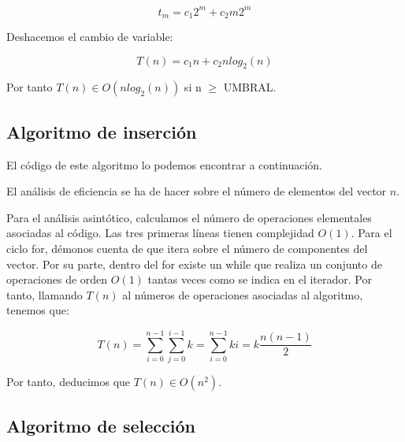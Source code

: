 \documentclass{homework}
\begin{document}
    \begin{equation}
        t_{m} = c_{1}2^{m} + c_{2}m2^{m}
    \end{equation}

    Deshacemos el cambio de variable:

    \begin{equation}
        T(n) = c_{1}n + c_{2}nlog_{2}(n)
    \end{equation}

    Por tanto $T(n) \in O(nlog_{2}(n))$ si n $\geq$ UMBRAL.

    \subsection{Algoritmo de inserción}

    El código de este algoritmo lo podemos encontrar a continuación.

    
    
    El análisis de eficiencia se ha de hacer sobre el número de elementos del vector $n$. 

    Para el análisis asintótico, calculamos el número de operaciones elementales asociadas al código. 
    Las tres primeras líneas tienen complejidad $O(1)$. Para el ciclo for, démonos cuenta de que itera sobre el número de
    componentes del vector. Por su parte, dentro del for existe un while que realiza un conjunto de operaciones de orden
    $O(1)$ tantas veces como se indica en el iterador. Por tanto, llamando $T(n)$ al números de operaciones asociadas
    al algoritmo, tenemos que:

    \begin{equation*}
        T(n) = \sum_{i=0}^{n-1} \sum_{j=0}^{i-1} k = \sum_{i=0}^{n-1} ki = k \frac{n(n-1)}{2} 
    \end{equation*}

    Por tanto, deducimos que $T(n) \in O(n^2)$. 

    \subsection{Algoritmo de selección}

        
\end{document}
